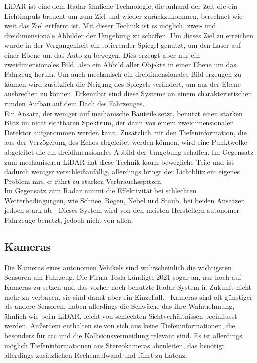 \documentclass[conference,compsoc,final,a4paper]{IEEEtran}
\begin{document}
\ac{LiDAR} ist eine dem Radar ähnliche Technologie, die anhand der Zeit die ein Lichtimpuls braucht um zum Ziel und wieder zurückzukommen, berechnet wie weit das Ziel entfernt ist.
Mit dieser Technik ist es möglich, zwei- und dreidimensionale Abbilder der Umgebung zu schaffen.
Um dieses Ziel zu erreichen wurde in der Vergangenheit ein rotierender Spiegel genutzt, um den Laser auf einer Ebene um das Auto zu bewegen.
Dies erzeugt aber nur ein zweidimensionales Bild, also ein Abbild aller Objekte in einer Ebene um das Fahrzeug herum.
Um auch mechanisch ein dreidimensionales Bild erzeugen zu können wird zusätzlich die Neigung des Spiegels verändert, um aus der Ebene ausbrechen zu können.
Erkennbar sind diese Systeme an einem charakteristischen runden Aufbau auf dem Dach des Fahrzeuges.\\
Ein Ansatz, der weniger auf mechanische Bauteile setzt, benutzt einen starken Blitz im nicht sichtbaren Spektrum, der dann von einem zweidimensionalen Detektor aufgenommen werden kann.
Zusätzlich mit den Tiefeninformation, die aus der Verzögerung des Echos abgeleitet werden können, wird eine Punktwolke abgeleitet die ein dreidimensionales Abbild der Umgebung
schaffen. Im Gegensatz zum mechanischen \ac{LiDAR} hat diese Technik kaum bewegliche Teile und ist dadurch weniger verschleißanfällig, allerdings bringt der Lichtblitz ein eigenes Problem mit,
er führt zu starken Verbrauchsspitzen.~\cite{Zhaohua2020}\\
Im Gegensatz zum Radar nimmt die Effektivität bei schlechten Wetterbedingungen, wie Schnee, Regen, Nebel und Staub, bei beiden Ansätzen jedoch stark ab.~\cite{Neal2018}
Dieses System wird von den meisten Herstellern autonomer Fahrzeuge benutzt, jedoch nicht von allen.~\cite{Dickson2021}

\subsection{Kameras}

Die Kameras eines autonomen Vehikels sind wahrscheinlich die wichtigsten Sensoren am Fahrzeug.
Die Firma Tesla kündigte 2021 sogar an, nur noch auf Kameras zu setzen und das vorher noch benutzte Radar-System in Zukunft nicht mehr zu verbauen, sie sind damit aber ein Einzelfall.~\cite{Koellner2022}
Kameras sind oft günstiger als andere Sensoren, haben allerdings die Schwäche das ihre Wahrnehmung, ähnlich wie beim LiDAR, leicht von schlechten Sichtverhältnissen beeinflusst werden.
Außerdem enthalten sie von sich aus keine Tiefeninformationen, die besonders für \ac{acc} und die Kollisionsvermeidung relevant sind.
Es ist allerdings möglich Tiefeninformationen aus Stereokameras abzuleiten, das benötigt allerdings zusätzlichen Rechenaufwand und führt zu Latenz.~\cite{Petit2022}\par
\end{document}
